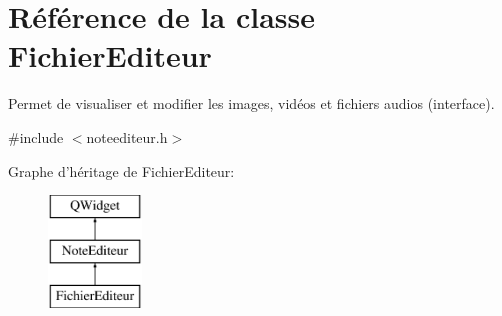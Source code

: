 \hypertarget{class_fichier_editeur}{\section{Référence de la classe Fichier\-Editeur}
\label{class_fichier_editeur}
}


Permet de visualiser et modifier les images, vidéos et fichiers audios (interface).  




{\ttfamily \#include $<$noteediteur.\-h$>$}

Graphe d'héritage de Fichier\-Editeur\-:\begin{figure}[H]
\begin{center}
\leavevmode
\includegraphics[height=3.000000cm]{class_fichier_editeur}
\end{center}
\end{figure}

